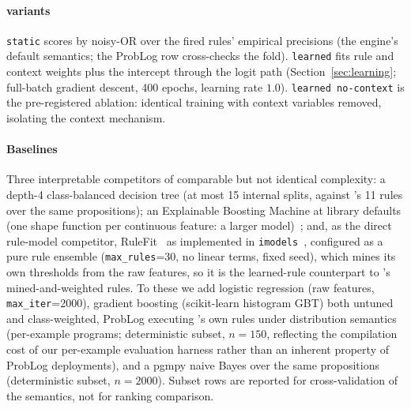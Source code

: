 \paragraph{\pla{} variants} \texttt{static} scores by noisy-OR over
the fired rules' empirical precisions (the engine's default semantics;
the ProbLog row cross-checks the fold). \texttt{learned} fits rule and
context weights plus the intercept through the logit path
(Section~\ref{sec:learning}; full-batch gradient descent, 400 epochs,
learning rate $1.0$). \texttt{learned no-context} is the pre-registered
ablation: identical training with context variables removed, isolating
the context mechanism.

\paragraph{Baselines} Three interpretable competitors of comparable
but not identical complexity: a depth-4 class-balanced decision tree
(at most 15 internal splits, against \pla{}'s 11 rules over the same
propositions); an Explainable Boosting Machine at library defaults
(one shape function per continuous feature: a larger
model)~\cite{lou2013,nori2019}; and, as the direct rule-model
competitor, RuleFit~\cite{friedman2008} as implemented in
\texttt{imodels}~\cite{singh2021}, configured as a pure rule ensemble
(\texttt{max\_rules}=30, no linear terms, fixed seed), which mines its
own thresholds from the raw features, so it is the learned-rule
counterpart to \pla{}'s mined-and-weighted rules. To these we add
logistic
regression (raw features, \texttt{max\_iter}=2000), gradient boosting
(scikit-learn histogram GBT) both untuned and class-weighted, ProbLog
executing \pla{}'s own rules under distribution semantics (per-example
programs; deterministic subset, $n{=}150$, reflecting the compilation
cost of our per-example evaluation harness rather than an inherent
property of ProbLog deployments), and a
pgmpy naive Bayes over the same propositions (deterministic subset,
$n{=}2000$). Subset rows are reported for cross-validation of the
semantics, not for ranking comparison.

